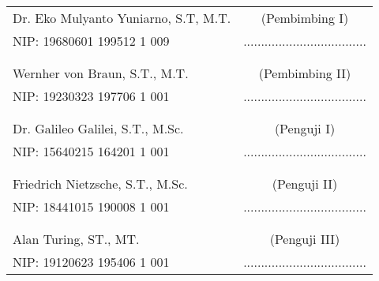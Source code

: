    \noindent
    \begin{tabularx}{\textwidth}{X c}
      Dr. Eko Mulyanto Yuniarno, S.T, M.T.          & (Pembimbing I) \\
      NIP: 19680601 199512 1 009        & ................................... \\
      &  \\
      &  \\
      Wernher von Braun, S.T., M.T.     & (Pembimbing II) \\
      NIP: 19230323 197706 1 001        & ................................... \\
      &  \\
      &  \\
      Dr. Galileo Galilei, S.T., M.Sc.  & (Penguji I) \\
      NIP: 15640215 164201 1 001        & ................................... \\
      &  \\
      &  \\
      Friedrich Nietzsche, S.T., M.Sc.  & (Penguji II) \\
      NIP: 18441015 190008 1 001        & ................................... \\
      &  \\
      &  \\
      Alan Turing, ST., MT.             & (Penguji III) \\
      NIP: 19120623 195406 1 001        & ................................... \\
    \end{tabularx}
  \endgroup

  \vspace{2ex}




\endgroup
